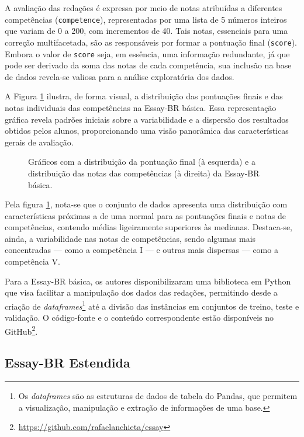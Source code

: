 A avaliação das redações é expressa por meio de notas atribuídas a diferentes competências (\texttt{competence}), representadas por uma lista de 5 números inteiros que variam de 0 a 200, com incrementos de 40. Tais notas, essenciais para uma correção multifacetada, são as responsáveis por formar a pontuação final (\texttt{score}). Embora o valor de \texttt{score} seja, em essência, uma informação redundante, já que pode ser derivado da soma das notas de cada competência, sua inclusão na base de dados revela-se valiosa para a análise exploratória dos dados.

A Figura \ref{fig:essay-br-basic-analysis} ilustra, de forma visual, a distribuição das pontuações finais e das notas individuais das competências na Essay-BR básica. Essa representação gráfica revela padrões iniciais sobre a variabilidade e a dispersão dos resultados obtidos pelos alunos, proporcionando uma visão panorâmica das características gerais de avaliação.

\begin{figure}[H]
    \caption{Gráficos com a distribuição da pontuação final (à esquerda) e a distribuição das notas das competências (à direita) da Essay-BR básica.}
    \label{fig:essay-br-basic-analysis}
    \centering
    \resizebox{\textwidth}{!}{}
\end{figure}

Pela figura \ref{fig:essay-br-basic-analysis}, nota-se que o conjunto de dados apresenta uma distribuição com características próximas a de uma normal para as pontuações finais e notas de competências, contendo médias ligeiramente superiores às medianas. Destaca-se, ainda, a variabilidade nas notas de competências, sendo algumas mais concentradas --- como a competência I --- e outras mais dispersas --- como a competência V.

Para a Essay-BR básica, os autores \citet{marinho-et-al-21} disponibilizaram uma biblioteca em Python que visa facilitar a manipulação dos dados das redações, permitindo desde a criação de \textit{dataframes}\footnote{Os \textit{dataframes} são as estruturas de dados de tabela do Pandas, que permitem a visualização, manipulação e extração de informações de uma base.} até a divisão das instâncias em conjuntos de treino, teste e validação. O código-fonte e o conteúdo correspondente estão disponíveis no GitHub\footnote{\url{https://github.com/rafaelanchieta/essay}}.

\subsection{Essay-BR Estendida}
\label{subsec:essay-br-extended}

